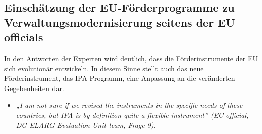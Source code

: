 \subsection{Einschätzung der EU-Förderprogramme zu Verwaltungsmodernisierung seitens der EU officials }
In den Antworten der Experten wird deutlich, dass die Förderinstrumente der EU sich evolutionär entwickeln. In diesem Sinne stellt auch das neue Förderinstrument, das IPA-Programm, eine Anpassung an die veränderten Gegebenheiten dar.
\begin{itemize}[label={}]
\item \textit{„I am not sure if we revised the instruments in the specific needs of these countries, but IPA is by definition quite a flexible instrument” (EC official, DG ELARG Evaluation Unit team, Frage 9).}
\end{itemize}

